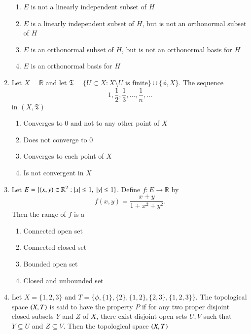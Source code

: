 \documentclass[journal,12pt,onecolumn]{IEEEtran}
\theoremstyle{remark}
\begin{document}
\begin{enumerate}
\begin{enumerate}[label=(\Alph*)]
\item $E$ is not a linearly independent subset of $H$
\item $E$ is a linearly independent subset of $H$, but is not an orthonormal subset of $H$
\item $E$ is an orthonormal subset of $H$, but is not an orthonormal basis for $H$
\item $E$ is an orthonormal basis for $H$
\end{enumerate}

\item Let $X = \mathbb{R}$ and let $\mathfrak{T} = \{U \subset X : X \setminus U \text{ is finite}\} \cup \{\phi, X\}$. The sequence
\[
1, \frac{1}{2}, \frac{1}{3}, \dots, \frac{1}{n}, \dots
\]
in $(X, \mathfrak{T})$  
\\[-0.3em]\makebox[\textwidth][r]{\textit{[GATE EE 2025]}}

\begin{enumerate}[label=(\Alph*)]
\item Converges to $0$ and not to any other point of $X$
\item Does not converge to $0$
\item Converges to each point of $X$
\item Is not convergent in $X$
\end{enumerate}

\item Let $E = \{(x,y) \in \mathbb{R}^2 : \left\vert x\right\vert \leq 1, \ \left\vert y\right\vert \leq 1\}$. Define $f : E \to \mathbb{R}$ by
\[
f(x,y) = \frac{x+y}{1+x^2+y^2}.
\]
Then the range of $f$ is a
\\[-0.3em]\makebox[\textwidth][r]{\textit{[GATE EE 2025]}}

\begin{enumerate}[label=(\Alph*)]
\item Connected open set
\item Connected closed set
\item Bounded open set
\item Closed and unbounded set
\end{enumerate}

\item Let $X = \{1,2,3\}$ and ${T} = \{\phi, \{1\}, \{2\}, \{1,2\}, \{2,3\}, \{1,2,3\}\}$.  
The topological space $\left(X, {T}\right)$ is said to have the property $P$ if for any two proper disjoint closed subsets $Y$ and $Z$ of $X$, there exist disjoint open sets $U, V$ such that $Y \subseteq U$ and $Z \subseteq V$.  
Then the topological space $\left(X, {T}\right)$  
\\[-0.3em]\makebox[\textwidth][r]{\textit{[GATE EE 2025]}}


\end{enumerate}
\end{document}
